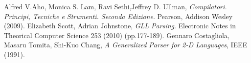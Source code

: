 \begin{thebibliography}{6}
Alfred V.Aho, Monica S. Lam, Ravi Sethi,Jeffrey D. Ullman,
\emph{Compilatori. Principi, Tecniche e Strumenti. Seconda Edizione}. Pearson, Addison Wesley (2009). 
Elizabeth Scott, Adrian Johnstone,
\emph{GLL Parsing}. Electronic Notes in Theorical Computer Science 253 (2010) (pp.177-189).
Gennaro Costagliola, Masaru Tomita, Shi-Kuo Chang,
\emph{A Generalized Parser for 2-D Languages}, IEEE (1991).
\end{thebibliography}